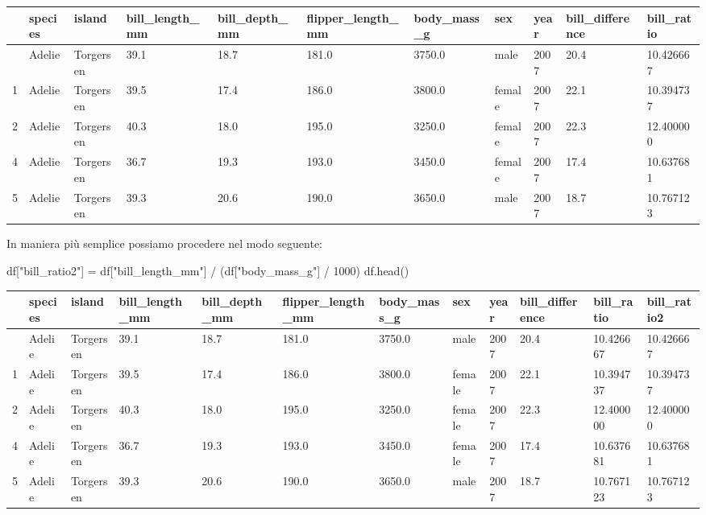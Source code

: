 \documentclass[
  letterpaper,
  krantz2]{{[}./krantz{]}}
\newenvironment{Shaded}{\begin{snugshade}}{\end{snugshade}}
\newcommand{\DecValTok}[1]{\textcolor[rgb]{0.68,0.00,0.00}{#1}}
\newcommand{\NormalTok}[1]{\textcolor[rgb]{0.00,0.23,0.31}{#1}}
\newcommand{\OperatorTok}[1]{\textcolor[rgb]{0.37,0.37,0.37}{#1}}
\newcommand{\StringTok}[1]{\textcolor[rgb]{0.13,0.47,0.30}{#1}}
\begin{document}
\begin{longtable}[]{@{}lllllllllll@{}}
\toprule\noalign{}
& species & island & bill\_length\_mm & bill\_depth\_mm &
flipper\_length\_mm & body\_mass\_g & sex & year & bill\_difference &
bill\_ratio \\
\midrule\noalign{}
\endhead
\bottomrule\noalign{}
\endlastfoot
0 & Adelie & Torgersen & 39.1 & 18.7 & 181.0 & 3750.0 & male & 2007 &
20.4 & 10.426667 \\
1 & Adelie & Torgersen & 39.5 & 17.4 & 186.0 & 3800.0 & female & 2007 &
22.1 & 10.394737 \\
2 & Adelie & Torgersen & 40.3 & 18.0 & 195.0 & 3250.0 & female & 2007 &
22.3 & 12.400000 \\
4 & Adelie & Torgersen & 36.7 & 19.3 & 193.0 & 3450.0 & female & 2007 &
17.4 & 10.637681 \\
5 & Adelie & Torgersen & 39.3 & 20.6 & 190.0 & 3650.0 & male & 2007 &
18.7 & 10.767123 \\
\end{longtable}

In maniera più semplice possiamo procedere nel modo seguente:

\begin{Shaded}
\begin{Highlighting}[]
\NormalTok{df[}\StringTok{"bill\_ratio2"}\NormalTok{] }\OperatorTok{=}\NormalTok{ df[}\StringTok{"bill\_length\_mm"}\NormalTok{] }\OperatorTok{/}\NormalTok{ (df[}\StringTok{"body\_mass\_g"}\NormalTok{] }\OperatorTok{/} \DecValTok{1000}\NormalTok{)}
\NormalTok{df.head()}
\end{Highlighting}
\end{Shaded}

\begin{longtable}[]{@{}llllllllllll@{}}
\toprule\noalign{}
& species & island & bill\_length\_mm & bill\_depth\_mm &
flipper\_length\_mm & body\_mass\_g & sex & year & bill\_difference &
bill\_ratio & bill\_ratio2 \\
\midrule\noalign{}
\endhead
\bottomrule\noalign{}
\endlastfoot
0 & Adelie & Torgersen & 39.1 & 18.7 & 181.0 & 3750.0 & male & 2007 &
20.4 & 10.426667 & 10.426667 \\
1 & Adelie & Torgersen & 39.5 & 17.4 & 186.0 & 3800.0 & female & 2007 &
22.1 & 10.394737 & 10.394737 \\
2 & Adelie & Torgersen & 40.3 & 18.0 & 195.0 & 3250.0 & female & 2007 &
22.3 & 12.400000 & 12.400000 \\
4 & Adelie & Torgersen & 36.7 & 19.3 & 193.0 & 3450.0 & female & 2007 &
17.4 & 10.637681 & 10.637681 \\
5 & Adelie & Torgersen & 39.3 & 20.6 & 190.0 & 3650.0 & male & 2007 &
18.7 & 10.767123 & 10.767123 \\
\end{longtable}
\end{document}
